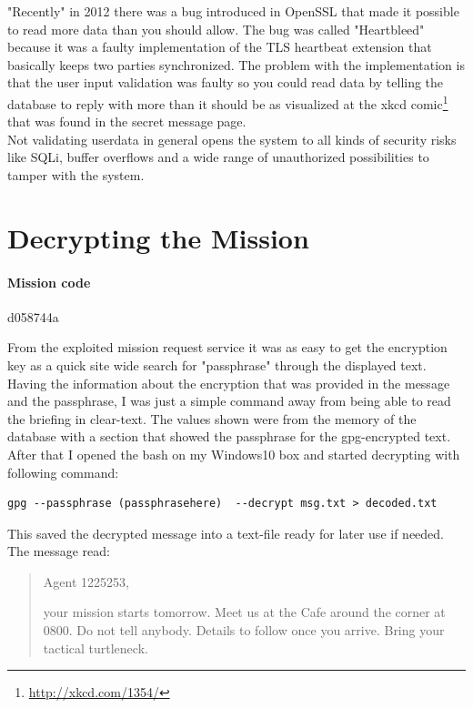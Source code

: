 \documentclass{scrartcl}
\newcommand\solution[2]{{\paragraph{#1}#2}}
\begin{document}
"Recently" in 2012 there was a bug introduced in OpenSSL that made it possible to read more data than you should allow. The bug was called "Heartbleed" because it was a faulty implementation of the TLS heartbeat extension that basically keeps two parties synchronized. The problem with the implementation is that the user input validation was faulty so you could read data by telling the database to reply with more than it should be as visualized at the xkcd comic\footnote{\url{http://xkcd.com/1354/}} that was found in the secret message page.  \\
Not validating userdata in general opens the system to all kinds of security risks like SQLi, buffer overflows and a wide range of unauthorized possibilities to tamper with the system.

\section*{Decrypting the Mission}
\solution{Mission code}{d058744a}

From the exploited mission request service it was as easy to get the encryption key as a quick site wide search for "passphrase" through the displayed text. Having the information about the encryption that was provided in the message and the passphrase, I was just a simple command away from being able to read the briefing in clear-text.
The values shown were from the memory of the database with a section that showed the passphrase for the gpg-encrypted text.   After that I opened the bash on my Windows10 box and started decrypting with following command:

\begin{lstlisting}
gpg --passphrase (passphrasehere)  --decrypt msg.txt > decoded.txt
\end{lstlisting}

This saved the decrypted message into a text-file ready for later use if needed. The message read:

\begin{quotation}
	Agent 1225253,
	
	your mission starts tomorrow. Meet us at the Cafe around the corner at 0800. Do not tell anybody. Details to follow once you arrive.
	Bring your tactical turtleneck.
\end{quotation}
\end{document}
